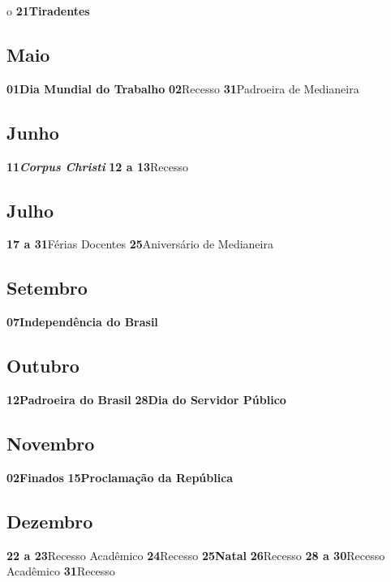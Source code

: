 \documentclass[thesis]{hmcposter}
\begin{document}
\begin{poster}
o \newline\textbf{21}\quad \quad \quad \quad \textbf{Tiradentes} \newline\subsection{Maio}\textbf{01}\quad \quad \quad \quad \textbf{Dia Mundial do Trabalho} \newline\textbf{02}\quad \quad \quad \quad Recesso \newline\textbf{31}\quad \quad \quad \quad Padroeira de Medianeira \newline\subsection{Junho}\textbf{11}\quad \quad \quad \quad \textbf{\textit{Corpus Christi}} \newline\textbf{12 a 13}\quad \quad Recesso \newline\subsection{Julho}\textbf{17 a 31}\quad \quad Férias Docentes \newline\textbf{25}\quad \quad \quad \quad Aniversário de Medianeira \newline\subsection{Setembro}\textbf{07}\quad \quad \quad \quad \textbf{Independência do Brasil} \newline\subsection{Outubro}\textbf{12}\quad \quad \quad \quad \textbf{Padroeira do Brasil} \newline\textbf{28}\quad \quad \quad \quad \textbf{Dia do Servidor Público} \newline\subsection{Novembro}\textbf{02}\quad \quad \quad \quad \textbf{Finados} \newline\textbf{15}\quad \quad \quad \quad \textbf{Proclamação da República} \newline\subsection{Dezembro}\textbf{22 a 23}\quad \quad Recesso Acadêmico \newline\textbf{24}\quad \quad \quad \quad Recesso \newline\textbf{25}\quad \quad \quad \quad \textbf{Natal} \newline\textbf{26}\quad \quad \quad \quad Recesso \newline\textbf{28 a 30}\quad \quad Recesso Acadêmico \newline\textbf{31}\quad \quad \quad \quad Recesso \newline\newpage

\end{poster}
\end{document}
